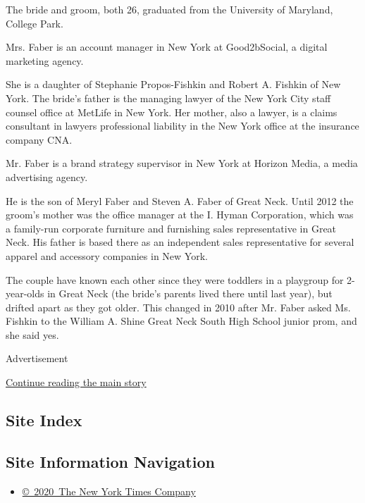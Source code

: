 The bride and groom, both 26, graduated from the University of Maryland,
College Park.

Mrs. Faber is an account manager in New York at Good2bSocial, a digital
marketing agency.

She is a daughter of Stephanie Propos-Fishkin and Robert A. Fishkin of
New York. The bride's father is the managing lawyer of the New York City
staff counsel office at MetLife in New York. Her mother, also a lawyer,
is a claims consultant in lawyers professional liability in the New York
office at the insurance company CNA.

Mr. Faber is a brand strategy supervisor in New York at Horizon Media, a
media advertising agency.

He is the son of Meryl Faber and Steven A. Faber of Great Neck. Until
2012 the groom's mother was the office manager at the I. Hyman
Corporation, which was a family-run corporate furniture and furnishing
sales representative in Great Neck. His father is based there as an
independent sales representative for several apparel and accessory
companies in New York.

The couple have known each other since they were toddlers in a playgroup
for 2-year-olds in Great Neck (the bride's parents lived there until
last year), but drifted apart as they got older. This changed in 2010
after Mr. Faber asked Ms. Fishkin to the William A. Shine Great Neck
South High School junior prom, and she said yes.

Advertisement

\protect\hyperlink{after-bottom}{Continue reading the main story}

\hypertarget{site-index}{%
\subsection{Site Index}\label{site-index}}

\hypertarget{site-information-navigation}{%
\subsection{Site Information
Navigation}\label{site-information-navigation}}

\begin{itemize}
\tightlist
\item
  \href{https://help.nytimes3xbfgragh.onion/hc/en-us/articles/115014792127-Copyright-notice}{©~2020~The
  New York Times Company}
\end{itemize}

